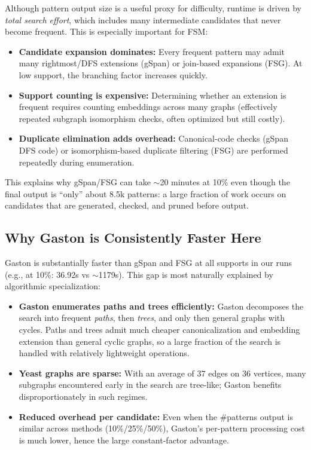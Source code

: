 \documentclass[11pt]{article}
\begin{document}
Although pattern output size is a useful proxy for difficulty, runtime is driven by \emph{total search effort}, which includes many intermediate candidates that never become frequent.
This is especially important for FSM:
\begin{itemize}
	\item \textbf{Candidate expansion dominates:} Every frequent pattern may admit many rightmost/DFS extensions (gSpan) or join-based expansions (FSG). At low support, the branching factor increases quickly.
	\item \textbf{Support counting is expensive:} Determining whether an extension is frequent requires counting embeddings across many graphs (effectively repeated subgraph isomorphism checks, often optimized but still costly).
	\item \textbf{Duplicate elimination adds overhead:} Canonical-code checks (gSpan DFS code) or isomorphism-based duplicate filtering (FSG) are performed repeatedly during enumeration.
\end{itemize}
This explains why gSpan/FSG can take $\sim$20 minutes at 10\% even though the final output is ``only'' about 8.5k patterns: a large fraction of work occurs on candidates that are generated, checked, and pruned before output.

\subsection{Why Gaston is Consistently Faster Here}

Gaston is substantially faster than gSpan and FSG at all supports in our runs (e.g., at 10\%: 36.92s vs $\sim$1179s).
This gap is most naturally explained by algorithmic specialization:

\begin{itemize}
	\item \textbf{Gaston enumerates paths and trees efficiently:} Gaston decomposes the search into frequent \emph{paths}, then \emph{trees}, and only then general graphs with cycles. Paths and trees admit much cheaper canonicalization and embedding extension than general cyclic graphs, so a large fraction of the search is handled with relatively lightweight operations.
	\item \textbf{Yeast graphs are sparse:} With an average of 37 edges on 36 vertices, many subgraphs encountered early in the search are tree-like; Gaston benefits disproportionately in such regimes.
	\item \textbf{Reduced overhead per candidate:} Even when the \#patterns output is similar across methods (10\%/25\%/50\%), Gaston’s per-pattern processing cost is much lower, hence the large constant-factor advantage.
\end{itemize}
\end{document}
